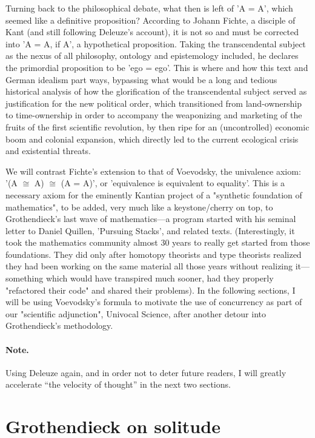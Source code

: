\documentclass[11pt]{article}
\begin{document}
Turning back to the philosophical debate, what then is left of 'A = A', which seemed
like a definitive proposition? According to Johann Fichte, a disciple of Kant (and still
following Deleuze's account), it is not so and must be corrected into 'A = A, if A', a
hypothetical proposition. Taking the transcendental subject as the nexus of all
philosophy, ontology and epistemology included, he declares the primordial proposition
to be 'ego = ego'. This is where and how this text and German idealism part ways,
bypassing what would be a long and tedious historical analysis of how the glorification
of the transcendental subject served as justification for the new political order, which
transitioned from land-ownership to time-ownership in order to accompany the weaponizing
and marketing of the fruits of the first scientific revolution, by then ripe for an
(uncontrolled) economic boom and colonial expansion, which directly led to the current
ecological crisis and existential threats.

We will contrast Fichte's extension to that of Voevodsky, the univalence axiom: '(A
\(\cong\) A) \(\cong\) (A = A)', or 'equivalence is equivalent to equality'. This is a
necessary axiom for the eminently Kantian project of a "synthetic foundation of
mathematics", to be added, very much like a keystone/cherry on top, to Grothendieck's
last wave of mathematics---a program started with his seminal letter to Daniel Quillen,
'Pursuing Stacks', and related texts. (Interestingly, it took the mathematics community
almost 30 years to really get started from those foundations. They did only after
homotopy theorists and type theorists realized they had been working on the same
material all those years without realizing it---something which would have transpired
much sooner, had they properly "refactored their code" and shared their problems). In
the following sections, I will be using Voevodsky's formula to motivate the use of
concurrency as part of our "scientific adjunction", Univocal Science, after another
detour into Grothendieck's methodology.

\paragraph{Note.}

Using Deleuze again, and in order not to deter future readers, I will greatly accelerate
``the velocity of thought'' in the next two sections.

\section*{Grothendieck on solitude}
\end{document}
